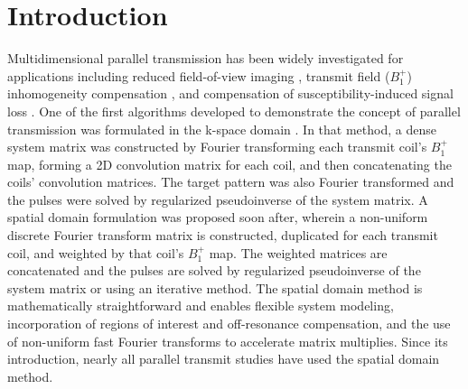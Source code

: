 \section* {Introduction}

\par Multidimensional parallel transmission \cite{Katscher:2003:Magn-Reson-Med:12509830,zhu2004parallel} has been widely investigated for applications including
reduced field-of-view imaging \cite{malik:mrm:2015,mooiweer:2016},
transmit field ($B_1^+$) inhomogeneity compensation \cite{Zhang:2007:Magn-Reson-Med:16526012,cloos:kpstd:2012},
and compensation of susceptibility-induced signal loss \cite{deng:2009}.
One of the first algorithms developed to demonstrate the concept of parallel transmission was formulated in the k-space domain \cite{Katscher:2003:Magn-Reson-Med:12509830}.
In that method, a dense system matrix was constructed by Fourier transforming each transmit coil's $B_1^+$ map,
forming a 2D convolution matrix for each coil, and then concatenating the coils' convolution matrices.
The target pattern was also Fourier transformed and the pulses were solved by regularized pseudoinverse of the system matrix. 
A spatial domain formulation \cite{Grissom:2006:MRM} was proposed soon after,
wherein a non-uniform discrete Fourier transform matrix is constructed, 
duplicated for each transmit coil, and weighted by that coil's $B_1^+$ map.
The weighted matrices are concatenated and the pulses are solved by regularized pseudoinverse of the system matrix
or using an iterative method.
The spatial domain method is mathematically straightforward 
and enables flexible system modeling, 
incorporation of regions of interest and off-resonance compensation,
and the use of non-uniform fast Fourier transforms to accelerate matrix multiplies.
Since its introduction, nearly all parallel transmit studies have used the spatial domain method. 

